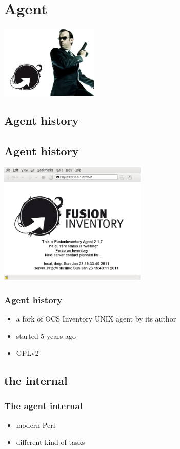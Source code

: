 %
\section{Agent}
\includegraphics[height=3.5cm]{./pics/agent-smith.jpg}
\subsection{Agent history}
\subsection{Agent history}
\begin{frame}
\includegraphics[height=5.8cm,transparent]{pics/http.png}
\end{frame}

\begin{frame}
\frametitle{Agent history}

\begin{itemize}
%
\item a fork of OCS Inventory UNIX agent by its author
\item started 5 years ago
\item GPLv2
%
\end{itemize}
\end{frame}
\subsection{the internal}
\begin{frame}
\frametitle{The agent internal}
%
\begin{itemize}
%
\item modern Perl
\item different kind of tasks
%
\end{itemize}
\end{frame}

